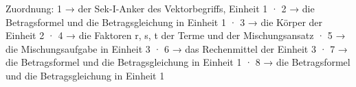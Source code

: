 
Zuordnung: 1 → der Sek-I-Anker des Vektorbegriffs, Einheit 1 · 2 → die Betragsformel und die Betragsgleichung in Einheit 1 · 3 → die Körper der Einheit 2 · 4 → die Faktoren r, s, t der Terme und der Mischungsansatz · 5 → die Mischungsaufgabe in Einheit 3 · 6 → das Rechenmittel der Einheit 3 · 7 → die Betragsformel und die Betragsgleichung in Einheit 1 · 8 → die Betragsformel und die Betragsgleichung in Einheit 1

